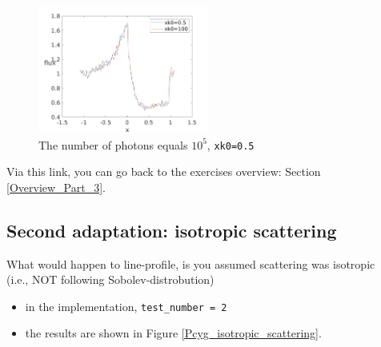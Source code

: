 \documentclass[../main/main.tex]{subfiles}
\begin{document}
\begin{figure}[!htbp]
\centering
\includegraphics[width=0.5\textwidth]{../../introductory_exercises/P_Cygni_profile_UV_resonance/data/npot5xk05alpha0beta1test11.png}
\caption{The number of photons equals $10^{5}$, \texttt{xk0=0.5}}
\label{PCyg_mu_eq_xk0_05_vs_100}
\end{figure}

Via this link, you can go back to the exercises overview: Section \underline{\ref{Overview_Part_3}}.


\newpage
\subsection{Second adaptation: isotropic scattering}
\label{isotropic_scattering}
What would happen to line-profile, is you assumed scattering
was isotropic 
\\(i.e., NOT following Sobolev-distrobution)

\begin{itemize}
\item in the implementation, \texttt{test\_number = 2}
\item the results are shown in Figure \ref{Pcyg_isotropic_scattering}.
\end{itemize}
\end{document}

